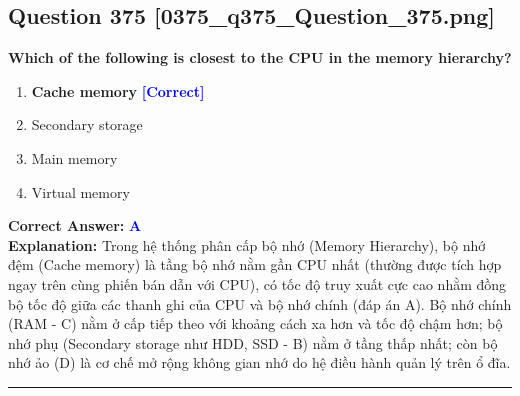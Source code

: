 \documentclass[11pt,a4paper]{article}
\begin{document}
\begin{minipage}{\textwidth}
\subsection*{Question 375 \quad \footnotesize{[0375\_q375\_Question\_375.png]}}
\noindent \textbf{Which of the following is closest to the CPU in the memory hierarchy?}

\begin{enumerate}[label=\Alph*.]
    \item \textbf{Cache memory} \hfill \textcolor{blue}{\textbf{[Correct]}}
    \item Secondary storage
    \item Main memory
    \item Virtual memory
\end{enumerate}

\noindent \textbf{Correct Answer:} \textcolor{blue}{\textbf{A}} \\[2pt]
\noindent \textbf{Explanation:} Trong hệ thống phân cấp bộ nhớ (Memory Hierarchy), bộ nhớ đệm (Cache memory) là tầng bộ nhớ nằm gần CPU nhất (thường được tích hợp ngay trên cùng phiến bán dẫn với CPU), có tốc độ truy xuất cực cao nhằm đồng bộ tốc độ giữa các thanh ghi của CPU và bộ nhớ chính (đáp án A). Bộ nhớ chính (RAM - C) nằm ở cấp tiếp theo với khoảng cách xa hơn và tốc độ chậm hơn; bộ nhớ phụ (Secondary storage như HDD, SSD - B) nằm ở tầng thấp nhất; còn bộ nhớ ảo (D) là cơ chế mở rộng không gian nhớ do hệ điều hành quản lý trên ổ đĩa.

\par\vspace{0.3cm}
\hrule
\vspace{0.3cm}
\end{minipage}
\end{document}
